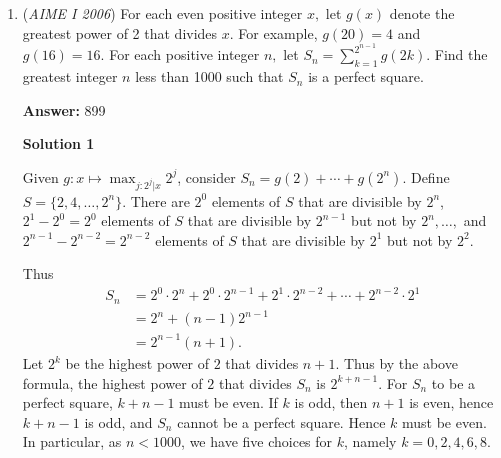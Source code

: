 \begin{enumerate}
 In Case 2, we have $z^{20}=1$ but $z^{10} \neq 1$. Thus, we have that the set of possible $z$ are 10th roots of unity shifted by $18^\circ$ counterclockwise, so we have

 
 \[\arg[z] \in \{18^\circ, 54^\circ, 90^\circ, \underline{126}^\circ, \underline{162}^\circ, \underline{198}^\circ, \dots, 342^\circ \}\]

 so we obtain $3$ values. In case 3, we have

 
 \[z^{3}+\frac{1}{z^{3}}=z^{5}+\frac{1}{z^{5}} \rightarrow z^{10}+z^{8}+z^{2}+1=0 \rightarrow (z^{8}+1)(z^{2}+1)=0\]

 so either $z \in \{i, -i\}$ or $z$ is a primitive 8th root of unity shifted by $22.5^\circ$, which gives 

 
 \[\arg[z] \in \{22.5^\circ, 67.5^\circ, \underline{112.5}^\circ, \underline{157.5}^\circ, 202.5^\circ, 247.5^\circ, 292.5^\circ, 337.5^\circ \}\]

 The sum of all underlined values is $150+126+162+198+112.5+157.5=\fbox{906}$



	\item (\textit{AIME I 2006}) For each even positive integer $x,$ let $g(x)$ denote the greatest power of 2 that divides $x.$ For example, $g(20)=4$ and $g(16)=16.$ For each positive integer $n,$ let $S_n=\sum_{k=1}^{2^{n-1}}g(2k).$ Find the greatest integer $n$ less than 1000 such that $S_n$ is a perfect square.


 
 \textbf{Answer: }899



\textbf{Solution 1}

Given $g : x \mapsto \max_{j : 2^j | x} 2^j$, consider $S_n = g(2) + \cdots + g(2^n)$. Define $S = \{2, 4, \ldots, 2^n\}$. There are $2^0$ elements of $S$ that are divisible by $2^n$, $2^1 - 2^0 = 2^0$ elements of $S$ that are divisible by $2^{n-1}$ but not by $2^n, \ldots,$ and $2^{n-1}-2^{n-2} = 2^{n-2}$ elements of $S$ that are divisible by $2^1$ but not by $2^2$.

 Thus 
 \begin{align*} S_n &= 2^0\cdot2^n + 2^0\cdot2^{n-1} + 2^1\cdot2^{n-2} + \cdots + 2^{n-2}\cdot2^1\\ &= 2^n + (n-1)2^{n-1}\\ &= 2^{n-1}(n+1).\end{align*}
 Let $2^k$ be the highest power of $2$ that divides $n+1$. Thus by the above formula, the highest power of $2$ that divides $S_n$ is $2^{k+n-1}$. For $S_n$ to be a perfect square, $k+n-1$ must be even. If $k$ is odd, then $n+1$ is even, hence $k+n-1$ is odd, and $S_n$ cannot be a perfect square. Hence $k$ must be even. In particular, as $n<1000$, we have five choices for $k$, namely $k=0,2,4,6,8$.


\end{enumerate}
